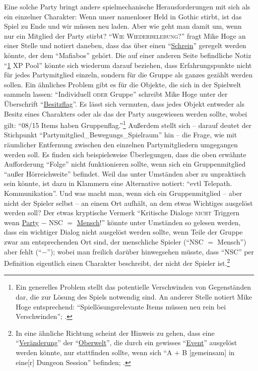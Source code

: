 \documentclass[a5paper,pagesize,numbers=noenddot]{scrbook}
\begin{document}
Eine solche Party bringt andere spielmechanische Herausforderungen mit sich als ein einzelner Charakter:
Wenn unser namenloser Held in Gothic stirbt, ist das Spiel zu Ende und wir müssen neu laden.
Aber wie geht man damit um, wenn nur ein Mitglied der Party stirbt?
\enquote{\textsc{Wie Wiederbelebung?}} fragt Mike Hoge an einer Stelle und notiert daneben, dass das über einen \enquote{\uline{Schrein}} geregelt werden könnte, der dem \enquote{Mafiabos} gehört.\autocite[S.~7]{orpheus_b_scribbles}
Die auf einer anderen Seite befindliche Notiz \enquote{\uline{1} XP Pool}\autocite[S.~8]{orpheus_b_scribbles} könnte sich wiederum darauf beziehen, dass Erfahrungspunkte nicht für jedes Partymitglied einzeln, sondern für die Gruppe als ganzes gezählt werden sollen.
Ein ähnliches Problem gibt es für die Objekte, die sich in der Spielwelt sammeln lassen:
\enquote{Individuell \textsc{oder} Gruppe} schreibt Mike Hoge unter der Überschrift \enquote{\uline{Besitzflag}}.
Es lässt sich vermuten, dass jedes Objekt entweder als Besitz eines Charakters oder als das der Party ausgewiesen werden sollte, wobei gilt:
\enquote{08/15 Items haben Gruppenflag.}\autocite[S.~9]{orpheus_b_scribbles}\footnote{Ein generelles Problem stellt das potentielle Verschwinden von Gegenständen dar, die zur Lösung des Spiels notwendig sind. An anderer Stelle notiert Mike Hoge entsprechend: \enquote{Spiellösungsrelevante Items müssen neu rein bei Verschwinden}; \autocite[S.~7]{orpheus_b_scribbles}.}
Außerdem stellt sich -- darauf deutet der Stichpunkt \enquote{Partymitglied\_Bewegungs\_Spielraum}\autocite[S.~8]{orpheus_b_scribbles} hin -- die Frage, wie mit räumlicher Entfernung zwischen den einzelnen Partymitgliedern umgegangen werden soll.
Es finden sich beispielsweise Überlegungen, dass die oben erwähnte Aufforderung \enquote{Folge} nicht funktionieren sollte, wenn sich ein Gruppenmitglied \enquote{außer Hörreichweite} befindet.
Weil das unter Umständen aber zu unpraktisch sein könnte, ist dazu in Klammern eine Alternative notiert:
\enquote{evtl Telepath. Kommunikation}.\autocite[S.~5]{orpheus_interface}
Und was macht man, wenn sich ein Gruppenmitglied -- aber nicht der Spieler selbst -- an einem Ort aufhält, an dem etwas Wichtiges ausgelöst werden soll?
Der etwas kryptische Vermerk \enquote{Kritische Dialoge \textsc{nicht} Triggern wenn \uline{Party} $-$ NSC $=$ \uline{Mensch}!}\autocite[S.~9]{orpheus_b_scribbles} könnte unter Umständen so gelesen werden, dass ein wichtiger Dialog nicht ausgelöst werden sollte, wenn Teile der Gruppe zwar am entsprechenden Ort sind, der menschliche Spieler (\enquote{NSC $=$ Mensch}) aber fehlt (\enquote{$-$}); wobei man freilich darüber hinwegsehen müsste, dass \enquote{NSC} per Definition eigentlich einen Charakter beschreibt, der nicht der Spieler ist.\footnote{In eine ähnliche Richtung scheint der Hinweis zu gehen, dass eine \enquote{\uline{Veränderung}} der \enquote{\uline{Oberwelt}}, die durch ein gewisses \enquote{\uline{Event}} ausgelöst werden könnte, nur stattfinden sollte, wenn sich \enquote{A $+$ B [gemeinsam] in eine[r] Dungeon Session} befinden; \autocite[S.~8]{orpheus_b_scribbles}.} %
\end{document}

